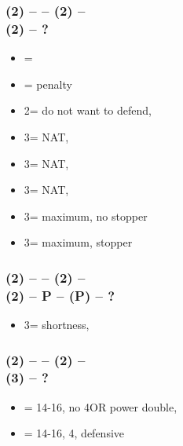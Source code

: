 \subsubsection*{(2\diams) -- \dbl -- (2\hearts) -- \dbl \\
                (2\spades) -- ?}        
\begin{itemize}
    \item \pass = \fonce
    \item \dbl = penalty
    \item 2\nt = do not want to defend, \gf
    \item 3\clubs = NAT, \gf
    \item 3\diams = NAT, \gf
    \item 3\hearts = NAT, \gf
    \item 3\spades = maximum, no \spades stopper
    \item 3\nt = maximum, stopper
\end{itemize}

\subsubsection*{(2\diams) -- \dbl -- (2\hearts) -- \dbl \\
                (2\spades) -- P -- (P) -- ?}
\begin{itemize}
    \item 3\spades = \spades shortness, \gf %
\end{itemize}

\subsubsection*{(2\diams) -- \dbl -- (2\spades) -- \dbl \\
                (3\hearts) -- ?}  
\begin{itemize}
    \item \pass = 14-16, no 4\spades OR power double, \fonce
    \item \dbl = 14-16, 4\spades, defensive
    
\end{itemize}


